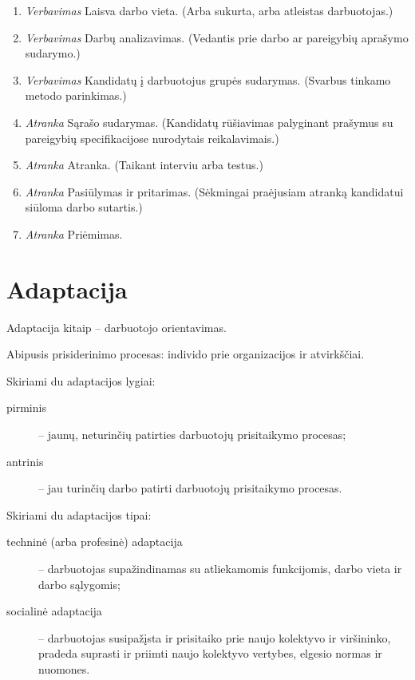 \begin{enumerate}
  \item \emph{Verbavimas} Laisva darbo vieta. (Arba sukurta, arba
    atleistas darbuotojas.)
  \item \emph{Verbavimas} Darbų analizavimas. (Vedantis prie darbo ar
    pareigybių aprašymo sudarymo.)
  \item \emph{Verbavimas} Kandidatų į darbuotojus grupės sudarymas.
    (Svarbus tinkamo metodo parinkimas.)
  \item \emph{Atranka} Sąrašo sudarymas. (Kandidatų rūšiavimas
    palyginant prašymus su pareigybių specifikacijose nurodytais
    reikalavimais.)
  \item \emph{Atranka} Atranka. (Taikant interviu arba testus.)
  \item \emph{Atranka} Pasiūlymas ir pritarimas. (Sėkmingai
    praėjusiam atranką kandidatui siūloma darbo sutartis.)
  \item \emph{Atranka} Priėmimas.
\end{enumerate}

\section{Adaptacija}

Adaptacija kitaip – darbuotojo orientavimas.

\begin{defn}[Adaptacija]
  Abipusis prisiderinimo procesas: individo prie organizacijos ir
  atvirkščiai.
\end{defn}

Skiriami du adaptacijos lygiai:
\begin{description}
  \item[pirminis] – jaunų, neturinčių patirties darbuotojų prisitaikymo
    procesas;
  \item[antrinis] – jau turinčių darbo patirti darbuotojų prisitaikymo
    procesas.
\end{description}

Skiriami du adaptacijos tipai:
\begin{description}
  \item[techninė (arba profesinė) adaptacija] – darbuotojas supažindinamas
    su atliekamomis funkcijomis, darbo vieta ir darbo sąlygomis;
  \item[socialinė adaptacija] – darbuotojas susipažįsta ir prisitaiko
    prie naujo kolektyvo ir viršininko, pradeda suprasti ir priimti
    naujo kolektyvo vertybes, elgesio normas ir nuomones.
\end{description}


